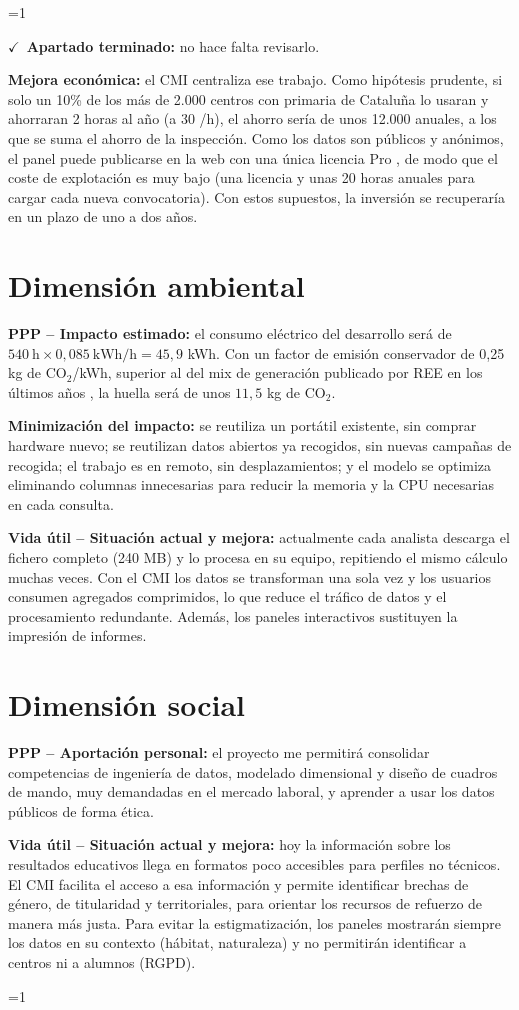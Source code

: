 \documentclass[12pt, a4paper, oneside]{report}
\newcommand{\mostrarterminados}{1}
\newenvironment{revisado}
  {\ifnum\mostrarterminados=1\relax\begin{cajarevisada}\noindent\colorbox{verdeterminado}{\parbox{\dimexpr\linewidth-2\fboxsep\relax}{\small$\checkmark$\ \textbf{Apartado terminado:} no hace falta revisarlo.}}\par\medskip\fi}
  {\ifnum\mostrarterminados=1\relax\end{cajarevisada}\fi}
\begin{document}
\begin{revisado}
\textbf{Mejora económica:} el CMI centraliza ese trabajo. Como hipótesis prudente, si solo un 10\% de los más de 2.000 centros con primaria de Cataluña lo usaran y ahorraran 2 horas al año (a 30 \texteuro{}/h), el ahorro sería de unos 12.000 \texteuro{} anuales, a los que se suma el ahorro de la inspección. Como los datos son públicos y anónimos, el panel puede publicarse en la web con una única licencia Pro \cite{ms_powerbi_pricing}, de modo que el coste de explotación es muy bajo (una licencia y unas 20 horas anuales para cargar cada nueva convocatoria). Con estos supuestos, la inversión se recuperaría en un plazo de uno a dos años.

\section{Dimensión ambiental}
\textbf{PPP -- Impacto estimado:} el consumo eléctrico del desarrollo será de $540\ \text{h} \times 0{,}085\ \text{kWh/h} = 45{,}9$ kWh. Con un factor de emisión conservador de 0,25 kg de CO$_2$/kWh, superior al del mix de generación publicado por REE en los últimos años \cite{ree_emisiones}, la huella será de unos $11{,}5$ kg de CO$_2$.

\textbf{Minimización del impacto:} se reutiliza un portátil existente, sin comprar hardware nuevo; se reutilizan datos abiertos ya recogidos, sin nuevas campañas de recogida; el trabajo es en remoto, sin desplazamientos; y el modelo se optimiza eliminando columnas innecesarias para reducir la memoria y la CPU necesarias en cada consulta.

\textbf{Vida útil -- Situación actual y mejora:} actualmente cada analista descarga el fichero completo (240 MB) y lo procesa en su equipo, repitiendo el mismo cálculo muchas veces. Con el CMI los datos se transforman una sola vez y los usuarios consumen agregados comprimidos, lo que reduce el tráfico de datos y el procesamiento redundante. Además, los paneles interactivos sustituyen la impresión de informes.

\section{Dimensión social}
\textbf{PPP -- Aportación personal:} el proyecto me permitirá consolidar competencias de ingeniería de datos, modelado dimensional y diseño de cuadros de mando, muy demandadas en el mercado laboral, y aprender a usar los datos públicos de forma ética.

\textbf{Vida útil -- Situación actual y mejora:} hoy la información sobre los resultados educativos llega en formatos poco accesibles para perfiles no técnicos. El CMI facilita el acceso a esa información y permite identificar brechas de género, de titularidad y territoriales, para orientar los recursos de refuerzo de manera más justa. Para evitar la estigmatización, los paneles mostrarán siempre los datos en su contexto (hábitat, naturaleza) y no permitirán identificar a centros ni a alumnos (RGPD).


\end{revisado}
\end{document}
